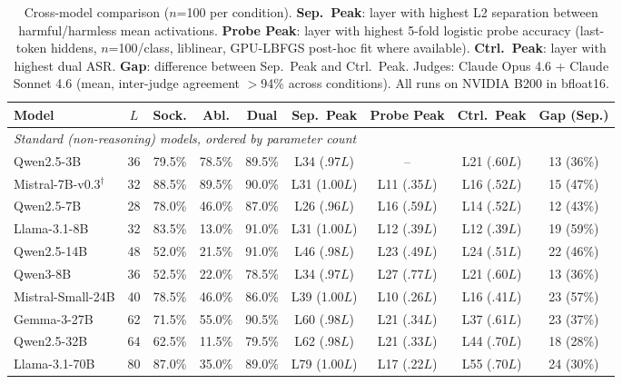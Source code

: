 \documentclass{article}
\begin{document}
\begin{table}[t]
\caption{Cross-model comparison ($n$=100 per condition). \textbf{Sep.\ Peak}: layer with highest L2 separation between harmful/harmless mean activations. \textbf{Probe Peak}: layer with highest 5-fold logistic probe accuracy (last-token hiddens, $n$=100/class, liblinear, GPU-LBFGS post-hoc fit where available). \textbf{Ctrl.\ Peak}: layer with highest dual ASR. \textbf{Gap}: difference between Sep.\ Peak and Ctrl.\ Peak. Judges: Claude Opus 4.6 + Claude Sonnet 4.6 (mean, inter-judge agreement $>$94\% across conditions). All runs on NVIDIA B200 in bfloat16.}
\label{tab:main_multi}
\begin{center}
\scriptsize
\begin{tabular}{lccc>{\columncolor{ctrlshade}}c>{\columncolor{sepshade}}c c>{\columncolor{ctrlshade}}c>{\columncolor{gapshade}}c}
\toprule
\textbf{Model} & $L$ & \textbf{Sock.} & \textbf{Abl.} & \textbf{Dual} & \textbf{Sep.\ Peak} & \textbf{Probe Peak} & \textbf{Ctrl.\ Peak} & \textbf{Gap (Sep.)} \\
\midrule
\multicolumn{9}{l}{\emph{Standard (non-reasoning) models, ordered by parameter count}} \\
Qwen2.5-3B   & 36 & 79.5\% & 78.5\% & 89.5\% & L34 (.97$L$) & -- & L21 (.60$L$) & 13 (36\%) \\
Mistral-7B-v0.3$^\dagger$ & 32 & 88.5\% & 89.5\% & 90.0\% & L31 (1.00$L$) & L11 (.35$L$) & L16 (.52$L$) & 15 (47\%) \\
Qwen2.5-7B   & 28 & 78.0\% & 46.0\% & 87.0\% & L26 (.96$L$) & L16 (.59$L$) & L14 (.52$L$) & 12 (43\%) \\
Llama-3.1-8B & 32 & 83.5\% & 13.0\% & 91.0\% & L31 (1.00$L$) & L12 (.39$L$) & L12 (.39$L$) & 19 (59\%) \\
Qwen2.5-14B  & 48 & 52.0\% & 21.5\% & 91.0\% & L46 (.98$L$) & L23 (.49$L$) & L24 (.51$L$) & 22 (46\%) \\
Qwen3-8B     & 36 & 52.5\% & 22.0\% & 78.5\% & L34 (.97$L$) & L27 (.77$L$) & L21 (.60$L$) & 13 (36\%) \\
Mistral-Small-24B & 40 & 78.5\% & 46.0\% & 86.0\% & L39 (1.00$L$) & L10 (.26$L$) & L16 (.41$L$) & 23 (57\%) \\
Gemma-3-27B  & 62 & 71.5\% & 55.0\% & 90.5\% & L60 (.98$L$) & L21 (.34$L$) & L37 (.61$L$) & 23 (37\%) \\
Qwen2.5-32B  & 64 & 62.5\% & 11.5\% & 79.5\% & L62 (.98$L$) & L21 (.33$L$) & L44 (.70$L$) & 18 (28\%) \\
Llama-3.1-70B & 80 & 87.0\% & 35.0\% & 89.0\% & L79 (1.00$L$) & L17 (.22$L$) & L55 (.70$L$) & 24 (30\%) \\

\end{tabular}
\end{center}
\end{table}
\end{document}
